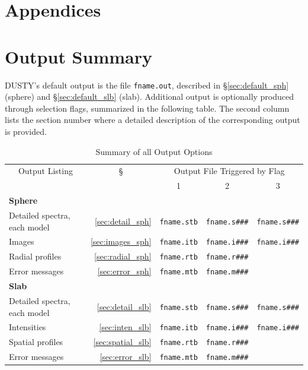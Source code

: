 \documentclass[11pt]{article}
\def\D    {{\sf DUSTY}}
\begin{document}
\begin{appendix}
\section*{\sc Appendices}


\section{Output Summary}
\label{summary}

\D's default output is the file {\tt fname.out}, described in
\S\ref{sec:default_sph} (sphere) and \S\ref{sec:default_slb}
(slab). Additional output is optionally produced through selection
flags, summarized in the following table.  The second column lists
the section number where a detailed description of the corresponding
output is provided.

  \begin{table}[htbp]
    \begin{center}
      \renewcommand{\arraystretch}{1.3}

\caption{\hfil Summary of all Output Options}\label{Options Table}
\centerline{} \renewcommand{\arraystretch}{1.3}
\begin{tabular}{|l|r||c|c|c|} \hline \multicolumn{1}{|c|}{Output
    Listing} & \multicolumn{1}{c||}{\S} & \multicolumn{3}{|c|}{Output
    File Triggered by Flag} \\ \cline{3-5} & & 1 & 2 & 3 \\ \hline
  {\bf Sphere} & & & &\\
  \hline
  Detailed spectra, each model     & \ref{sec:detail_sph} & {\tt fname.stb} & {\tt fname.s\#\#\#} & {\tt fname.s\#\#\#} \\
  \hline
  Images                           & \ref{sec:images_sph} & {\tt fname.itb} & {\tt fname.i\#\#\#} & {\tt fname.i\#\#\#} \\
  \hline
  Radial profiles                  & \ref{sec:radial_sph} & {\tt fname.rtb} & {\tt fname.r\#\#\#} &  \\
  \hline
  Error messages                   & \ref{sec:error_sph} & {\tt fname.mtb} & {\tt fname.m\#\#\#} &  \\
  \hline
  {\bf Slab} & & & &\\
  \hline
  Detailed spectra, each model     & \ref{sec:detail_slb} & {\tt fname.stb} & {\tt fname.s\#\#\#} & {\tt fname.s\#\#\#} \\
  \hline
  Intensities                      & \ref{sec:inten_slb}  & {\tt fname.itb} & {\tt fname.i\#\#\#} & {\tt fname.i\#\#\#} \\
  \hline
  Spatial profiles                 & \ref{sec:spatial_slb} & {\tt fname.rtb} & {\tt fname.r\#\#\#} &  \\
  \hline
  Error messages                   & \ref{sec:error_slb}  & {\tt fname.mtb} & {\tt fname.m\#\#\#} &  \\
  \hline
\end{tabular}
\end{center}
\end{table}



\end{appendix}
\end{document}
